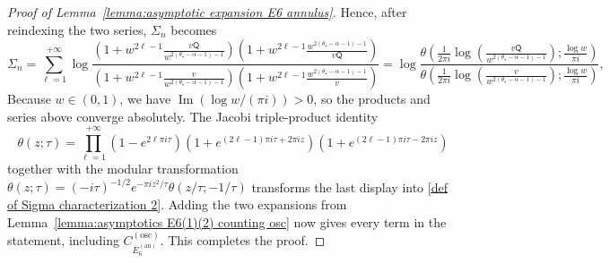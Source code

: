 \documentclass[a4paper]{article}
\numberwithin{equation}{section}
\begin{document}
\begin{proof}[Proof of Lemma~\ref{lemma:asymptotic expansion E6 annulus}]

Hence, after reindexing the two series, $\Sigma_n$ becomes
\[
\Sigma_n
=
\sum_{\ell=1}^{+\infty}
\log
\frac{(1+w^{2\ell-1}\tfrac{v \mathsf{Q}}{w^{2(\theta_{\star}-\alpha-1)-1}})(1+w^{2\ell-1}\tfrac{w^{2(\theta_{\star}-\alpha-1)-1}}
{v\mathsf{Q}})}{(1+w^{2\ell-1}\tfrac{v}{w^{2(\theta_{\star}-\alpha-1)-1}})
(1+w^{2\ell-1}\tfrac{w^{2(\theta_{\star}-\alpha-1)-1}}{v})}
=
\log \frac{\theta(\tfrac{1}{2\pi i}\log(\tfrac{v\mathsf{Q}}{w^{2(\theta_{\star}-\alpha-1)-1}});\tfrac{\log w}{\pi i})}{\theta(\tfrac{1}{2\pi i}\log(\tfrac{v}{w^{2(\theta_{\star}-\alpha-1)-1}});\tfrac{\log w}{\pi i})},
\]
Because $w\in(0,1)$, we have
$\operatorname{Im}(\log w/(\pi i))>0$, so the products and series above
converge absolutely.  The Jacobi triple-product identity
\[
\theta(z;\tau)
=\prod_{\ell=1}^{+\infty}(1-e^{2\ell \pi i\tau})(1+e^{(2\ell-1)\pi i \tau+2\pi iz})(1+e^{(2\ell-1)\pi i \tau-2\pi iz })
\]
together with the modular transformation
$\theta(z;\tau)=(-i\tau)^{-1/2}e^{-\pi i z^2/\tau}
\theta(z/\tau;-1/\tau)$ transforms the last display into
\eqref{def of Sigma characterization 2}.  Adding the two expansions from
Lemma~\ref{lemma:asymptotics E6(1)(2) counting osc} now gives every term in the
statement, including $C_{E_6^{(\mathrm{an})}}^{(\mathrm{osc})}$.  This
completes the proof.

\end{proof}
\end{document}

